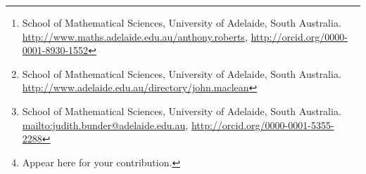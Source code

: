

\author{A.~J.~Roberts\thanks{%
School of Mathematical Sciences, University of Adelaide, South Australia.
\url{http://www.maths.adelaide.edu.au/anthony.roberts},
\url{http://orcid.org/0000-0001-8930-1552}}
\and John~Maclean\thanks{%
School of Mathematical Sciences, University of Adelaide, South Australia.
\url{http://www.adelaide.edu.au/directory/john.maclean}}
\and J.~E.~Bunder\thanks{%
School of Mathematical Sciences, University of Adelaide, South Australia.
\protect\url{mailto:judith.bunder@adelaide.edu.au},
\protect\url{http://orcid.org/0000-0001-5355-2288}}
\and et~al.\thanks{Appear here for your contribution.}
}

\date{\today}

\renewcommand{\and}{\hspace{2em plus 1em minus 1em}}



\usepackage[dvipsnames]{xcolor}


\usepackage{pgfplots} 
\pgfplotsset{compat=newest} %
\usetikzlibrary{decorations.markings}
\usetikzlibrary{shapes,arrows,fit}
\usetikzlibrary{positioning}

\usepackage{bold-extra}
\usepackage[T1]{fontenc}
\usepackage{caption}


\usepackage{fancyvrb}
\newenvironment{matlab}%
    {\Verbatim[numbers=left,firstnumber=\the\inputlineno]}%
    {\endVerbatim}
\makeatletter
\def\fancyvrbStartStop{%
  \edef\FancyVerbStartString{\@percentchar\@charrb} 
  \edef\FancyVerbStopString{\@percentchar\@charlb} }
\makeatother


\usepackage{natbib}

\AtBeginDocument{\let\harvardurl\url}

\usepackage{versions}
\newenvironment{devMan}{}{} %
\newenvironment{userMan}{}{} %


